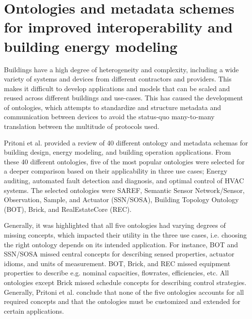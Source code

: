 \section{Ontologies and metadata schemes for improved interoperability and building energy modeling}

Buildings have a high degree of heterogeneity and complexity, including a wide variety of systems and devices from different contractors and providers. This makes it difficult to develop applications and models that can be scaled and reused across different buildings and use-cases. This has caused the development of ontologies, which attempts to standardize and structure metadata and communication between devices to avoid the status-quo many-to-many translation between the multitude of protocols used. 

Pritoni et al. \cite{Pritoni2021} provided a review of 40 different ontology and metadata schemas for building design, energy modeling, and building operation applications. From these 40 different ontologies, five of the most popular ontologies were selected for a deeper comparison based on their applicability in three use cases; Energy auditing, automated fault detection and diagnosis, and optimal control of HVAC systems. The selected ontologies were SAREF, Semantic Sensor Network/Sensor, Observation, Sample, and Actuator (SSN/SOSA), Building Topology Ontology (BOT), Brick, and RealEstateCore (REC). 


Generally, it was highlighted that all five ontologies had varying degrees of missing concepts, which impacted their utility in the three use cases, i.e. choosing the right ontology depends on its intended application. For instance, BOT and SSN/SOSA missed central concepts for describing sensed properties, actuator idioms, and units of measurement. BOT, Brick, and REC missed equipment properties to describe e.g. nominal capacities, flowrates, efficiencies, etc. All ontologies except Brick missed schedule concepts for describing control strategies. Generally, Pritoni et al. conclude that none of the five ontologies accounts for all required concepts and that the ontologies must be customized and extended for certain applications. 







